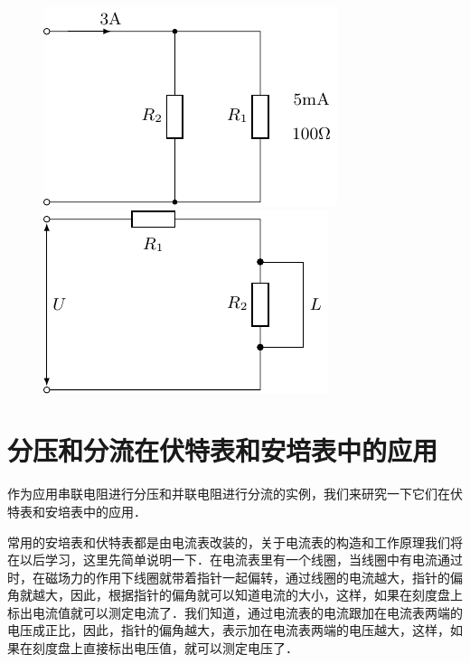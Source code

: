 \begin{figure}[htbp]
    \centering
    \begin{minipage}[t]{0.48\textwidth}
        \centering
        \includegraphics{fig/B/7-14.pdf}
        \caption{}\label{fig_B_7-14}
    \end{minipage}
    \begin{minipage}[t]{0.48\textwidth}
        \centering
        \includegraphics{fig/B/7-15.pdf}
        \caption{}\label{fig_B_7-15}
    \end{minipage}
\end{figure}

\section{分压和分流在伏特表和安培表中的应用}
作为应用串联电阻进行分压和并联电阻进行分流的实例，我们来研究一下它们在伏特表和安培表中的应用．

常用的安培表和伏特表都是由电流表改装的，关于电流表的构造和工作原理我们将在以后学习，这里先简单说明一下．在电流表里有一个线圈，当线圈中有电流通过时，在磁场力的作用下线圈就带着指针一起偏转，通过线圈的电流越大，指针的偏角就越大，因此，根据指针的偏角就可以知道电流的大小，这样，如果在刻度盘上标出电流值就可以测定电流了．我们知道，通过电流表的电流跟加在电流表两端的电压成正比，因此，指针的偏角越大，表示加在电流表两端的电压越大，这样，如果在刻度盘上直接标出电压值，就可以测定电压了．

